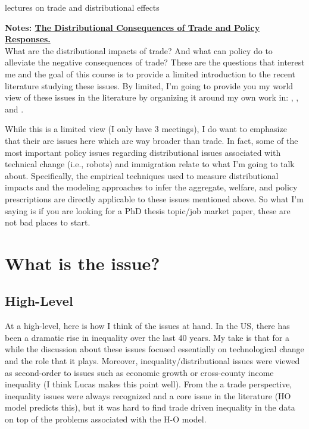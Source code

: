 \documentclass[pdftex,12pt]{article}
\begin{document}
lectures on trade and distributional effects 

\pagestyle{fancy}

\noindent \textbf{Notes: \href{http://www.waugheconomics.com/}{ The Distributional Consequences of Trade and Policy Responses.}}\\

\noindent  What are the distributional impacts of trade? And what can policy do to alleviate the negative consequences of trade?  These are the questions that interest me and the goal of this course is to provide a limited introduction to the recent literature studying these issues. By limited, I'm going to provide you my world view of these issues in the literature by organizing it around my own work in: \citet{lyon2019}, \citet{lyon2018redistributing}, and \citet{waugh_consumption}.

\medskip
\noindent While this is a limited view (I only have 3 meetings), I do want to emphasize that their are issues here which are way broader than trade. In fact, some of the most important policy issues regarding distributional issues associated with technical change (i.e., robots) and immigration relate to what I'm going to talk about. Specifically, the empirical techniques used to measure distributional impacts and the modeling approaches to infer the aggregate, welfare, and policy prescriptions are directly applicable to these issues mentioned above. So what I'm saying is if you are looking for a PhD thesis topic/job market paper, these are not bad places to start.

\section{What is the issue?}

\subsection{High-Level}

At a high-level, here is how I think of the issues at hand. In the US, there has been a dramatic rise in inequality over the last 40 years. My take is that for a while the discussion about these issues focused essentially on technological change and the role that it plays. Moreover, inequality/distributional issues were viewed as second-order to issues such as economic growth or cross-county income inequality (I think Lucas makes this point well). From the a trade perspective, inequality issues were always recognized and a core issue in the literature (HO model predicts this), but it was hard to find trade driven inequality in the data on top of the problems associated with the H-O model.
\end{document}
